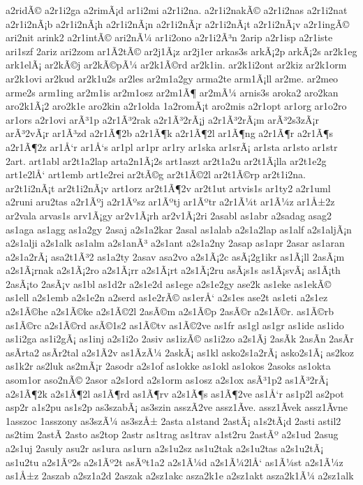 {a2ridÃ©
a2r1i2ga
a2rimÃ¡d
ar1i2mi
a2r1i2na.
a2r1i2nakÃ©
a2r1i2nas
a2r1i2nat
a2r1i2nÃ¡b
a2r1i2nÃ¡h
a2r1i2nÃ¡n
a2r1i2nÃ¡r
a2r1i2nÃ¡t
a2r1i2nÃ¡v
a2r1ingÃ©
ari2nit
arink2
a2r1intÃ©
ari2nÃ¼
ar1i2ono
a2r1i2Ã³n
2arip
a2r1isp
a2r1iste
ari1szf
2ariz
ari2zom
ar1Ã­2tÃ©
ar2j1Ã¡z
ar2j1er
arkas3s
arkÃ¡2p
arkÃ¡2s
ar2k1eg
ark1elÃ¡
ar2kÃ©j
ar2kÃ©pÃ¼
ar2k1Ã©rd
ar2k1in.
ar2k1i2ont
ar2kiz
ar2k1orm
ar2k1ovi
ar2kud
ar2k1u2s
ar2les
ar2m1a2gy
arma2te
arm1Ã¡ll
ar2me.
ar2meo
arme2s
arm1ing
ar2m1is
ar2m1osz
ar2m1Ã¶
ar2mÃ¼
arnis3s
aroka2
aro2kan
aro2k1Ã¡2
aro2k1e
aro2kin
a2r1olda
1a2romÃ¡t
aro2mis
a2r1opt
ar1org
ar1o2ro
ar1ors
a2r1ovi
arÃ³1p
a2r1Ã³2rak
a2r1Ã³2rÃ¡j
a2r1Ã³2rÃ¡m
arÃ³2s3zÃ¡r
arÃ³2vÃ¡r
ar1Ã³zd
a2r1Ã¶2b
a2r1Ã¶k
a2r1Ã¶2l
ar1Ã¶ng
a2r1Ã¶r
a2r1Ã¶s
a2r1Ã¶2z
ar1Å‘r
ar1Å‘s
ar1pl
ar1pr
ar1ry
ar1ska
ar1srÃ¡
ar1sta
ar1sto
ar1str
2art.
art1abl
ar2t1a2lap
arta2n1Ã¡2s
art1aszt
ar2t1a2u
ar2t1Ã¡lla
ar2t1e2g
art1e2lÅ‘
art1emb
art1e2rei
ar2tÃ©g
ar2t1Ã©2l
ar2t1Ã©rp
ar2t1i2na.
ar2t1i2nÃ¡t
ar2t1i2nÃ¡v
art1orz
ar2t1Ã¶2v
ar2t1ut
artvis1s
ar1ty2
a2r1uml
a2runi
aru2tas
a2r1Ãºj
a2r1Ãºsz
ar1Ãºtj
ar1Ãºtr
a2r1Ã¼t
ar1Ã¼z
ar1Å±2z
ar2vala
arvas1s
arv1Ã¡gy
ar2v1Ã¡rh
ar2v1Ã¡2ri
2asabl
as1abr
a2sadag
asag2
as1aga
as1agg
as1a2gy
2asaj
a2s1a2kar
2asal
as1alab
a2s1a2lap
as1alf
a2s1aljÃ¡n
a2s1alji
a2s1alk
as1alm
a2s1anÃ³
a2s1ant
a2s1a2ny
2asap
as1apr
2asar
as1aran
a2s1a2rÃ¡
asa2t1Ã³2
as1a2ty
2asav
asa2vo
a2s1Ã¡2c
asÃ¡2g1ikr
as1Ã¡ll
2asÃ¡m
a2s1Ã¡rnak
a2s1Ã¡2ro
a2s1Ã¡rr
a2s1Ã¡rt
a2s1Ã¡2ru
asÃ¡s1s
as1Ã¡svÃ¡
as1Ã¡th
2asÃ¡to
2asÃ¡v
as1bl
as1d2r
a2s1e2d
as1ege
a2s1e2gy
ase2k
as1eke
as1ekÃ©
as1ell
a2s1emb
a2s1e2n
a2serd
as1e2rÃ©
as1erÅ‘
a2s1es
ase2t
as1eti
a2s1ez
a2s1Ã©he
a2s1Ã©ke
a2s1Ã©2l
2asÃ©m
a2s1Ã©p
2asÃ©r
a2s1Ã©r.
as1Ã©rb
as1Ã©rc
a2s1Ã©rd
asÃ©1s2
as1Ã©tv
as1Ã©2ve
as1fr
as1gl
as1gr
as1ide
as1ido
as1i2ga
as1i2gÃ¡
as1inj
a2s1i2o
2asiv
as1izÃ©
as1i2zo
a2s1Ã­j
2asÃ­k
2asÃ­n
2asÃ­r
asÃ­rta2
asÃ­r2tal
a2s1Ã­2v
as1Ã­zÃ¼
2askÃ¡
as1kl
asko2s1a2rÃ¡
asko2s1Ã¡
as2koz
as1k2r
as2luk
as2mÃ¡r
2asodr
a2s1of
as1okke
as1okl
as1okos
2asoks
as1okta
asom1or
aso2nÃ©
2asor
a2s1ord
a2s1orm
as1osz
a2s1ox
asÃ³1p2
as1Ã³2rÃ¡
a2s1Ã¶2k
a2s1Ã¶2l
as1Ã¶rd
as1Ã¶rv
a2s1Ã¶s
as1Ã¶2ve
as1Å‘r
as1p2l
as2pot
asp2r
a1s2pu
as1s2p
as3szabÃ¡
as3szin
asszÃ­2ve
assz1Ã­ve.
assz1Ã­vek
assz1Ã­vne
1asszoc
1asszony
as3szÃ¼
as3szÅ±
2asta
a1stand
2astÃ¡
a1s2tÃ¡d
2asti
astil2
as2tim
2astÃ­
2asto
as2top
2astr
as1trag
as1trav
a1st2ru
2astÃº
a2s1ud
2asug
a2s1uj
2asuly
asu2r
as1ura
as1urn
a2s1u2sz
as1u2tak
a2s1u2tas
a2s1u2tÃ¡
as1u2tu
a2s1Ãº2s
a2s1Ãº2t
asÃºt1a2
a2s1Ã¼d
a2s1Ã¼2lÅ‘
as1Ã¼st
a2s1Ã¼z
as1Å±z
2aszab
a2sz1a2d
2aszak
a2sz1akc
asza2k1e
a2sz1akt
asza2k1Ã¼
a2sz1alk
}
